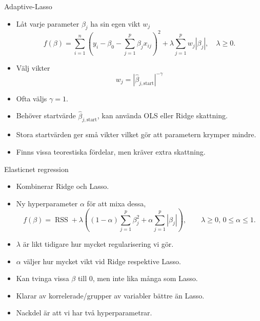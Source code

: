\documentclass[10pt,english]{beamer}
\begin{document}
\begin{frame}{Adaptive-Lasso}
    \begin{itemize}
        \item Låt varje parameter $\beta_j$ ha sin egen vikt $w_j$
        \begin{equation*}
            f(\beta) = \sum_{i=1}^{n}\left(y_i - \beta_0 - \sum_{j=1}^{p}\beta_j x_{ij}\right)^2 + \lambda \sum_{j=1}^{p} w_j |\beta_j|, \quad \lambda \geq 0.
        \end{equation*}
        \item Välj vikter
        \begin{equation*}
            w_j = | \hat{\beta}_{j, \text{start}} |^{-\gamma}
        \end{equation*}
        \item Ofta väljs $\gamma = 1$.
        \item Behöver startvärde $\hat{\beta}_{j,\text{start}}$, kan använda OLS eller Ridge skattning.
        \item Stora startvärden ger små vikter vilket gör att parametern krymper mindre.
        \item Finns vissa teorestiska fördelar, men kräver extra skattning.
    \end{itemize}
\end{frame}

\begin{frame}{Elasticnet regression}

    \begin{itemize}
        \item Kombinerar Ridge och Lasso.
        \item Ny hyperparameter $\alpha$ för att mixa dessa,
        \begin{equation*}
            f(\beta) = \operatorname{RSS} + \lambda \left((1-\alpha) \sum_{j=1}^{p}\beta_j^2 + \alpha \sum_{j=1}^{p}|\beta_j|  \right), \qquad \lambda \geq 0,\, 0 \leq \alpha \leq 1.
        \end{equation*}
        \item $\lambda$ är likt tidigare hur mycket regularisering vi gör.
        \item $\alpha$ väljer hur mycket vikt vid Ridge respektive Lasso.
        \item Kan tvinga vissa $\beta$ till 0, men inte lika många som Lasso.
        \item Klarar av korrelerade/grupper av variabler bättre än Lasso.
        \item Nackdel är att vi har två hyperparametrar.
    \end{itemize}
    
\end{frame}
\end{document}
